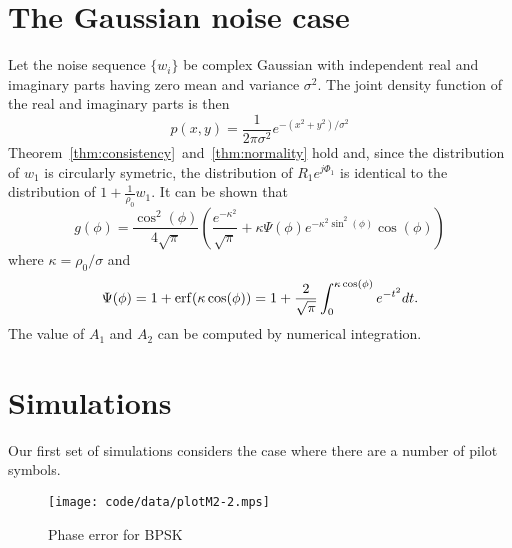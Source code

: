 \documentclass[journal]{IEEEtran}
\begin{document}
\section{The Gaussian noise case}

Let the noise sequence $\{w_i\}$ be complex Gaussian with independent real and imaginary parts having zero mean and variance $\sigma^2$.  The joint density function of the real and imaginary parts is then
\[
p(x,y) = \frac{1}{2\pi\sigma^2}e^{-(x^2 + y^2)/\sigma^2}
\]
Theorem~\ref{thm:consistency}~and~\ref{thm:normality} hold and, since the distribution of $w_1$ is circularly symetric, the distribution of $R_1e^{j\Phi_1}$ is identical to the distribution of $1 + \frac{1}{\rho_0} w_1$.
It can be shown that
\[
g(\phi) = \frac{\cos^2(\phi)}{4\sqrt{\pi}}\left( \frac{e^{-\kappa^2} }{\sqrt{\pi}} + \kappa \Psi(\phi)  e^{-\kappa^2\sin^2(\phi)}\cos(\phi) \right)
\]
where $\kappa = \rho_0/\sigma$ and
\[
\Psi(\phi) = 1 + \operatorname{erf}(\kappa \cos(\phi)) = 1 + \frac{2}{\sqrt{\pi}}\int_0^{\kappa \cos(\phi)} e^{-t^2} dt .
\]
The value of $A_1$ and $A_2$ can be computed by numerical integration.


\section{Simulations}\label{sec:simulations}


Our first set of simulations considers the case where there are a number of pilot symbols.



\begin{figure}[tp]
	\centering
		\texttt{[image: code/data/plotM2-2.mps]}
		\caption{Phase error for BPSK}
		\label{fig:plotphase}
\end{figure}

\end{document}
